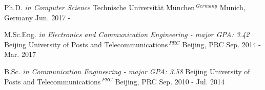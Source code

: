 



\begin{cventries}

\cvpublication
{Ph.D. \it{in Computer Science}} %
{Technische Universität München$^{~\textit{Germany}}$} %
{Munich, Germany} %
{Jun. 2017 - } %


\cvpublication
{M.Sc.Eng. \it{in Electronics and Communication Engineering} - major GPA: 3.42} %
{Beijing University of Posts and Telecommunications$^{~\textit{PRC}}$} %
{Beijing, PRC} %
{Sep. 2014 - Mar. 2017} %


\cvpublication
{B.Sc. \it{in Communication Engineering} - major GPA: 3.58} %
{Beijing University of Posts and Telecommunications$^{~\textit{PRC}}$} %
{Beijing, PRC} %
{Sep. 2010 - Jul. 2014} %

\end{cventries}
